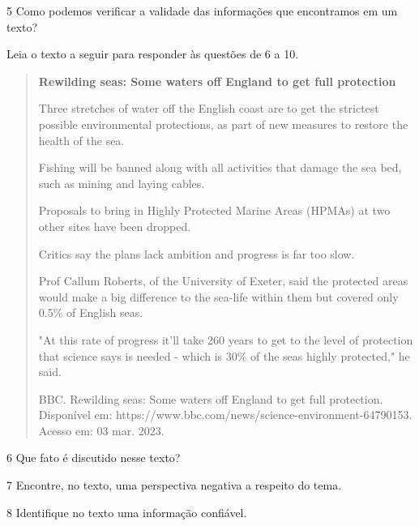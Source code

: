 \num{5} Como podemos verificar a validade das informações que encontramos em um texto?

\linhas[2]


Leia o texto a seguir para responder às questões de 6 a 10.


\begin{quote}
\textbf{Rewilding seas: Some waters off England to get full protection}

Three stretches of water off the English coast are to get the strictest
possible environmental protections, as part of new measures to restore
the health of the sea.

Fishing will be banned along with all activities that damage the sea
bed, such as mining and laying cables.

Proposals to bring in Highly Protected Marine Areas (HPMAs) at two other
sites have been dropped.

Critics say the plans lack ambition and progress is far too slow.

Prof Callum Roberts, of the University of Exeter, said the protected
areas would make a big difference to the sea-life within them but
covered only 0.5\% of English seas.

"At this rate of progress it'll take 260 years to get to the level of
protection that science says is needed - which is 30\% of the seas
highly protected," he said.

BBC. Rewilding seas: Some waters off England to get full protection.
Disponível em: https://www.bbc.com/news/science-environment-64790153.
Acesso em: 03 mar. 2023.
\end{quote}


\num{6} Que fato é discutido nesse texto?

\linhas[3]


\num{7} Encontre, no texto, uma perspectiva negativa a respeito do tema.

\linhas[2]


\num{8} Identifique no texto uma informação confiável.

